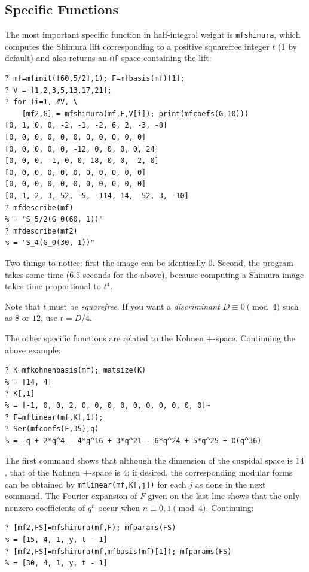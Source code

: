 \documentclass[11pt]{article}
\def\kbd#1{{\tt #1}}
\begin{document}
\subsection{Specific Functions}

The most important specific function in half-integral weight is
\kbd{mfshimura}, which computes the Shimura lift corresponding to a
positive squarefree integer $t$ (1 by default) and also returns an \kbd{mf}
space containing the lift:

\begin{verbatim}
? mf=mfinit([60,5/2],1); F=mfbasis(mf)[1];
? V = [1,2,3,5,13,17,21];
? for (i=1, #V, \
    [mf2,G] = mfshimura(mf,F,V[i]); print(mfcoefs(G,10)))
[0, 1, 0, 0, -2, -1, -2, 6, 2, -3, -8]
[0, 0, 0, 0, 0, 0, 0, 0, 0, 0, 0]
[0, 0, 0, 0, 0, -12, 0, 0, 0, 0, 24]
[0, 0, 0, -1, 0, 0, 18, 0, 0, -2, 0]
[0, 0, 0, 0, 0, 0, 0, 0, 0, 0, 0]
[0, 0, 0, 0, 0, 0, 0, 0, 0, 0, 0]
[0, 1, 2, 3, 52, -5, -114, 14, -52, 3, -10]
? mfdescribe(mf)
% = "S_5/2(G_0(60, 1))"
? mfdescribe(mf2)
% = "S_4(G_0(30, 1))"
\end{verbatim}

Two things to notice: first the image can be identically $0$.
Second, the program takes some time (6.5 seconds for the above), because
computing a Shimura image takes time proportional to $t^4$.

Note that $t$ must be \emph{squarefree}. If you want a \emph{discriminant}
$D\equiv0\pmod4$ such as $8$ or $12$, use $t=D/4$.

\smallskip

The other specific functions are related to the Kohnen $+$-space. Continuing
the above example:

\begin{verbatim}
? K=mfkohnenbasis(mf); matsize(K)
% = [14, 4]
? K[,1]
% = [-1, 0, 0, 2, 0, 0, 0, 0, 0, 0, 0, 0, 0, 0]~
? F=mflinear(mf,K[,1]);
? Ser(mfcoefs(F,35),q)
% = -q + 2*q^4 - 4*q^16 + 3*q^21 - 6*q^24 + 5*q^25 + O(q^36)
\end{verbatim}

The first command shows that although the dimension of the cuspidal space
is $14$, that of the Kohnen $+$-space is $4$; if desired, the corresponding
modular forms can be obtained by \kbd{mflinear(mf,K[,j])} for each $j$ as
done in the next command. The Fourier expansion of $F$ given
on the last line shows that the only nonzero coefficients of $q^n$ occur
when $n\equiv0,1\pmod4$. Continuing:

\begin{verbatim}
? [mf2,FS]=mfshimura(mf,F); mfparams(FS)
% = [15, 4, 1, y, t - 1]
? [mf2,FS]=mfshimura(mf,mfbasis(mf)[1]); mfparams(FS)
% = [30, 4, 1, y, t - 1]
\end{verbatim}
\end{document}
